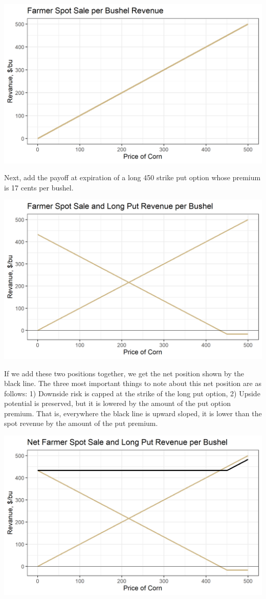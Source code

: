 \documentclass[
]{book}
\begin{document}
\includegraphics{assets/Options4-spot.png}

Next, add the payoff at expiration of a long 450 strike put option whose premium is 17 cents per bushel.

\includegraphics{assets/Options4-spotput.png}

If we add these two positions together, we get the net position shown by the black line. The three most important things to note about this net position are as follows: 1) Downside risk is capped at the strike of the long put option, 2) Upside potential is preserved, but it is lowered by the amount of the put option premium. That is, everywhere the black line is upward sloped, it is lower than the spot revenue by the amount of the put premium.

\includegraphics{assets/Options4-spotputcomb.png}
\end{document}
